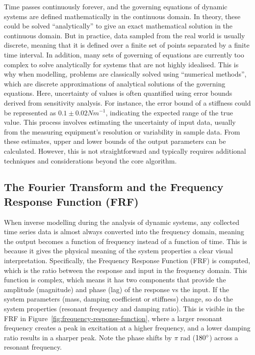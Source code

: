 \documentclass[12pt]{article}
\begin{document}
    Time passes continuously forever, and the governing equations of dynamic systems are defined mathematically in the continuous domain.
    In theory, these could be solved ``analytically'' to give an exact mathematical solution in the continuous domain.
    But in practice, data sampled from the real world is usually discrete, meaning that it is defined over a finite set of points separated by a finite time interval.
    In addition, many sets of governing of equations are currently too complex to solve analytically for systems that are not highly idealised.
    This is why when modelling, problems are classically solved using ``numerical methods'', which are discrete approximations of analytical solutions of the governing equations.
    Here, uncertainty of values is often quantified using error bounds derived from sensitivity analysis.
    For instance, the error bound of a stiffness could be represented as $0.1 \pm 0.02 Nm^{-1}$, indicating the expected range of the true value.
    This process involves estimating the uncertainty of input data, usually from the measuring equipment's resolution or variability in sample data.
    From these estimates, upper and lower bounds of the output parameters can be calculated.
    However, this is not straightforward and typically requires additional techniques and considerations beyond the core algorithm.


    \subsection{The Fourier Transform and the Frequency Response Function (FRF)}

    When inverse modelling during the analysis of dynamic systems, any collected time series data is almost always converted into the frequency domain, meaning the output becomes a function of frequency instead of a function of time.
    This is because it gives the physical meaning of the system properties a clear visual interpretation.
    Specifically, the Frequency Response Function (FRF) is computed, which is the ratio between the response and input in the frequency domain.
    This function is complex, which means it has two components that provide the amplitude (magnitude) and phase (lag) of the response vs the input.
    If the system parameters (mass, damping coefficient or stiffness) change, so do the system properties (resonant frequency and damping ratio).
    This is visible in the FRF in Figure~\ref{fig:frequency-response-function}, where a larger resonant frequency creates a peak in excitation at a higher frequency, and a lower damping ratio results in a sharper peak.
    Note the phase shifts by $\pi$ rad ($180\degree$) across a resonant frequency.
\end{document}
